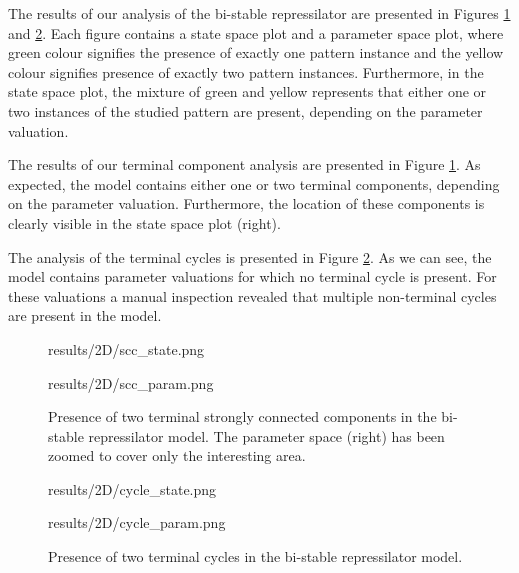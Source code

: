 The results of our analysis of the bi-stable repressilator are presented in Figures \ref{fig:biSCC} and \ref{fig:biCycle}. Each figure contains a state space plot and a parameter space plot, where green colour signifies the presence of exactly one pattern instance and the yellow colour signifies presence of exactly two pattern instances. Furthermore, in the state space plot, the mixture of green and yellow represents that either one or two instances of the studied pattern are present, depending on the parameter valuation.

The results of our terminal component analysis are presented in Figure \ref{fig:biSCC}. As expected, the model contains either one or two terminal components, depending on the parameter valuation. Furthermore, the location of these components is clearly visible in the state space plot (right). 

The analysis of the terminal cycles is presented in Figure \ref{fig:biCycle}. As we can see, the model contains parameter valuations for which no terminal cycle is present. For these valuations a manual inspection revealed that multiple non-terminal cycles are present in the model.

\begin{figure}
	
	\begin{center}
		\begin{overpic}[width=.5\textwidth]{results/2D/scc_state.png}\end{overpic}\hfill
		\begin{overpic}[width=.5\textwidth]{results/2D/scc_param.png}\end{overpic}\hfill
	\end{center}
	
	\caption{Presence of two terminal strongly connected components in the bi-stable repressilator model. The parameter space (right) has been zoomed to cover only the interesting area.  }
	\label{fig:biSCC}
\end{figure}

\begin{figure}
	
	\begin{center}
		\begin{overpic}[width=.5\textwidth]{results/2D/cycle_state.png}\end{overpic}\hfill
		\begin{overpic}[width=.5\textwidth]{results/2D/cycle_param.png}\end{overpic}\hfill
	\end{center}
	
	\caption{Presence of two terminal cycles in the bi-stable repressilator model.}
	\label{fig:biCycle}
\end{figure}

